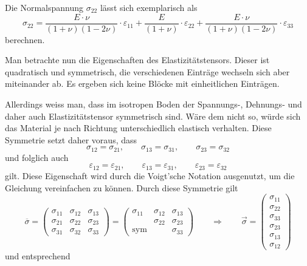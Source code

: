 Die Normalspannung $\sigma_{22}$ lässt sich exemplarisch als
\[
\sigma_{22}
=
\frac{E\cdot\nu}{(1+\nu)(1-2\nu)}\cdot\varepsilon_{11}+\frac{E}{(1+\nu)}\cdot\varepsilon_{22}+\frac{E\cdot\nu}{(1+\nu)(1-2\nu)}\cdot\varepsilon_{33}
\]
berechnen.

Man betrachte nun die Eigenschaften des Elastizitätstensors.
Dieser ist quadratisch und symmetrisch, die verschiedenen Einträge wechseln sich aber miteinander ab.
Es ergeben sich keine Blöcke mit einheitlichen Einträgen.

Allerdings weiss man, dass im isotropen Boden der Spannungs-, Dehnungs- und daher auch Elastizitätstensor symmetrisch sind.
Wäre dem nicht so, würde sich das Material je nach Richtung unterschiedlich elastisch verhalten.
Diese Symmetrie setzt daher voraus, dass
\[
\sigma_{12}
=
\sigma_{21}
,
\qquad
\sigma_{13}
=
\sigma_{31}
,
\qquad
\sigma_{23}
=
\sigma_{32}
\]
und folglich auch
\[
\varepsilon_{12}
=
\varepsilon_{21}
,
\qquad
\varepsilon_{13}
=
\varepsilon_{31}
,
\qquad
\varepsilon_{23}
=
\varepsilon_{32}
\]
gilt.
Diese Eigenschaft wird durch die Voigt'sche Notation \cite{spannung:Voigtsche-Notation} ausgenutzt, um die Gleichung vereinfachen zu können.
Durch diese Symmetrie gilt
\[
\overline{\sigma}
=
\begin{pmatrix}
	\sigma_{11} & \sigma_{12} & \sigma_{13} \\ 
	\sigma_{21} & \sigma_{22} & \sigma_{23} \\
	\sigma_{31} & \sigma_{32} & \sigma_{33}
\end{pmatrix}
=
\begin{pmatrix}
	\sigma_{11} & \sigma_{12} & \sigma_{13} \\ 
  	            & \sigma_{22} & \sigma_{23} \\
	 \text{sym} &             & \sigma_{33} 
\end{pmatrix}
\qquad
\Rightarrow
\qquad
\vec{\sigma}
=
\begin{pmatrix}
    \sigma_{11}\\
	\sigma_{22}\\
	\sigma_{33}\\
	\sigma_{23}\\
	\sigma_{13}\\
	\sigma_{12}
\end{pmatrix}
\]
und entsprechend
